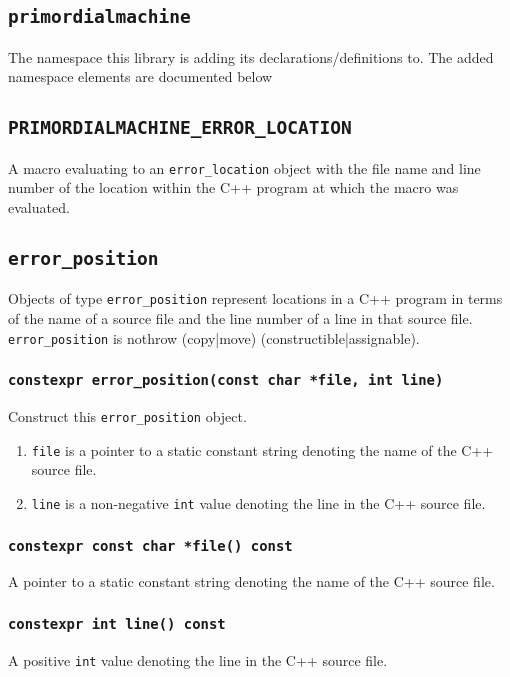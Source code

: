 \documentclass[oneside]{article}
\begin{document}
\subsection{\texttt{primordialmachine}}
The namespace this library is adding its declarations/definitions to.
The added namespace elements are documented below

\subsection{\texttt{PRIMORDIALMACHINE\_ERROR\_LOCATION}}
A macro evaluating to an \texttt{error\_location} object with the file name and line number of the
location within the C++ program at which the macro was evaluated.
\subsection{\texttt{error\_position}}
Objects of type \texttt{error\_position} represent locations in a C++ program in terms of the   name
of a source file and the line number of a line in that source file. \texttt{error\_position}      is
nothrow (copy|move) (constructible|assignable).

\subsubsection{\texttt{constexpr error\_position(const char *file, int line)}}
Construct this \texttt{error\_position} object.
\begin{enumerate}
   \item\texttt{file} is a pointer to a static constant string denoting the name of the C++ source file.
   \item\texttt{line} is a non-negative \texttt{int} value denoting the line in the C++ source file.
\end{enumerate}

\subsubsection{\texttt{constexpr const char *file() const}}
A pointer to a static constant string denoting the name of the C++ source file.

\subsubsection{\texttt{constexpr int line() const}}
A positive \texttt{int} value denoting the line in the C++ source file.
\end{document}

